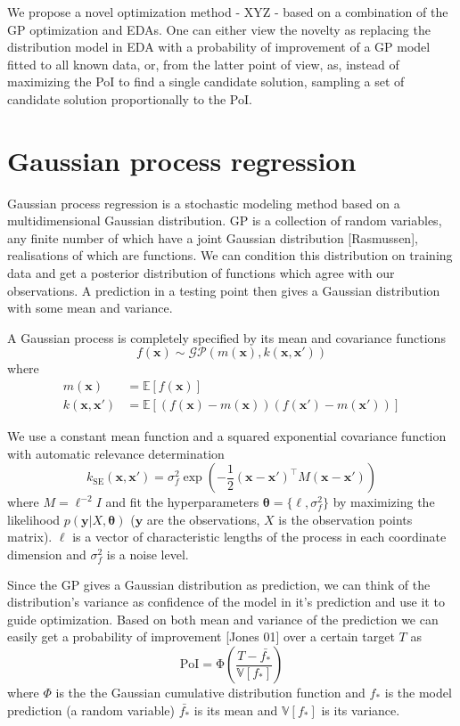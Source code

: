 \documentclass{sig-alternate}
\newcommand{\xx}{\mathrm{\mathbf{x}}}
\newcommand{\yy}{\mathrm{\mathbf{y}}}
\newcommand{\ttheta}{\mathbf{\theta}}
\newcommand{\eell}{\boldsymbol\ell}
\begin{document}
We propose a novel optimization method - XYZ - based on a combination of the GP optimization and EDAs. One can either
view the novelty as replacing the distribution model in EDA with a probability of improvement of a GP model 
fitted to all known data, or, from the latter point of view, as, instead of maximizing the PoI to find a single
candidate solution, sampling a set of candidate solution proportionally to the PoI. 

\section{Gaussian process regression}

Gaussian process regression is a stochastic modeling method based on a multidimensional Gaussian distribution. 
GP is a collection of random variables, any finite number of which have a joint Gaussian distribution [Rasmussen], 
realisations of which are functions. We can condition this distribution on training data and get a posterior 
distribution of functions which agree with our observations. A prediction in a testing point then gives a Gaussian 
distribution with some mean and variance. 

A Gaussian process is completely specified by its mean and covariance functions
$$
  f(\xx) \sim \mathcal{GP}\left( m(\xx), k(\xx, \xx')\right)
$$
where
\begin{align*}
  m(\xx) &= \mathbb{E} \left[ f(\xx) \right] \\
  k(\xx, \xx') &= \mathbb{E} \left[ (f(\xx) - m(\xx))(f(\xx') - m(\xx')) \right] 
\end{align*}

We use a constant mean function and a squared exponential covariance function with
automatic relevance determination
$$
  k_{\mathrm{SE}}(\xx, \xx') = \sigma_f^2 \exp\left( - \frac{1}{2} (\xx - \xx')^\top M (\xx - \xx') \right)
$$
where $ M = \eell^{-2}I $ and fit the hyperparameters $\ttheta = \{ \eell, \sigma_f^2 \}$ by 
maximizing the likelihood $p(\yy | X, \ttheta)$ ($\yy$ are the observations, $X$ is the observation 
points matrix). $\eell$ is a vector of characteristic lengths of the process in each coordinate dimension
and $\sigma_f^2$ is a noise level.

Since the GP gives a Gaussian distribution as prediction, we can think of the distribution's variance
as confidence of the model in it's prediction and use it to guide optimization. Based on both mean 
and variance of the prediction we can easily get a probability of improvement [Jones 01] over a 
certain target $T$ as
$$
 \mathrm{PoI} = \mathrm{\Phi}\left( \frac{T - \bar{f_*}}{\mathbb{V}[f_*]} \right)
$$
where $\Phi$ is the the Gaussian cumulative distribution function and $f_*$ is the model prediction (a random
variable) $\bar{f_*}$ is its mean and $\mathbb{V}[f_*]$ is its variance.
\end{document}
